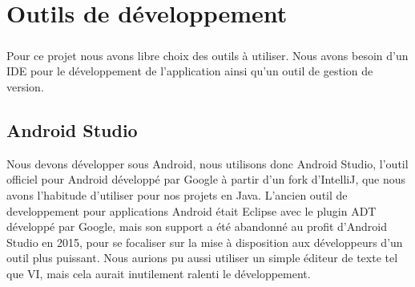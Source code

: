 \documentclass[a4paper,10pt]{report}
\begin{document}

\chapter{Outils de développement}
  \paragraph{}
  Pour ce projet nous avons libre choix des outils à utiliser. Nous avons besoin d'un IDE pour le développement de l'application ainsi qu'un outil de gestion de version.

  \section{Android Studio}
  Nous devons développer sous Android, nous utilisons donc Android Studio, l'outil officiel pour Android développé par Google à partir d'un fork d'IntelliJ, que nous avons l'habitude d'utiliser pour nos projets en Java. L'ancien outil de developpement pour applications Android était Eclipse avec le plugin ADT développé par Google, mais son support a été abandonné au profit d'Android Studio en 2015, pour se focaliser sur la mise à disposition aux développeurs d'un outil plus puissant. Nous aurions pu aussi utiliser un simple éditeur de texte tel que VI, mais cela aurait inutilement ralenti le développement.
\end{document}
